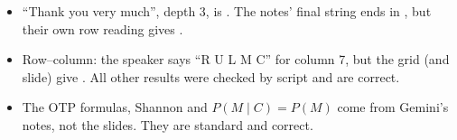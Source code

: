 \begin{fixbox}
\begin{itemize}
  \item ``Thank you very much'', depth 3, is \textbf{}. The notes' final string ends in , but their own row reading gives .
  \item Row--column: the speaker says ``R U L M C'' for column 7, but the grid (and slide) give . All other results were checked by script and are correct.
  \item The OTP formulas, Shannon and $P(M\mid C) = P(M)$ come from Gemini's notes, not the slides. They are standard and correct.
\end{itemize}
\end{fixbox}
